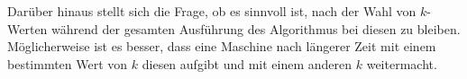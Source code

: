 \documentclass[a4paper, 11pt, ngerman]{article}
\theoremstyle{definition}
\theoremstyle{plain}
\theoremstyle{remark}
\begin{document}
Darüber hinaus stellt sich die Frage, ob es sinnvoll ist, nach der Wahl von $k$-Werten während der gesamten Ausführung des Algorithmus bei diesen zu bleiben. Möglicherweise ist es besser, dass eine Maschine nach längerer Zeit mit einem bestimmten Wert von $k$ diesen aufgibt und mit einem anderen $k$ weitermacht.

\newpage
\printbibliography
\end{document}
